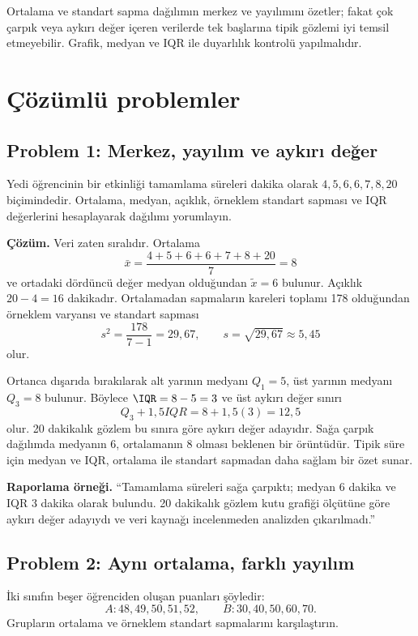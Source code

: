 \begin{assumptionbox}
Ortalama ve standart sapma dağılımın merkez ve yayılımını özetler; fakat çok
çarpık veya aykırı değer içeren verilerde tek başlarına tipik gözlemi iyi
temsil etmeyebilir. Grafik, medyan ve IQR ile duyarlılık kontrolü yapılmalıdır.
\end{assumptionbox}

\section{Çözümlü problemler}

\subsection*{Problem 1: Merkez, yayılım ve aykırı değer}

Yedi öğrencinin bir etkinliği tamamlama süreleri dakika olarak
$4,5,6,6,7,8,20$ biçimindedir. Ortalama, medyan, açıklık, örneklem standart
sapması ve IQR değerlerini hesaplayarak dağılımı yorumlayın.

\textbf{Çözüm.} Veri zaten sıralıdır. Ortalama
\[
\bar{x}=\frac{4+5+6+6+7+8+20}{7}=8
\]
ve ortadaki dördüncü değer medyan olduğundan $\widetilde{x}=6$ bulunur.
Açıklık $20-4=16$ dakikadır. Ortalamadan sapmaların kareleri toplamı 178
olduğundan örneklem varyansı ve standart sapması
\[
s^2=\frac{178}{7-1}=29{,}67,
\qquad s=\sqrt{29{,}67}\approx5{,}45
\]
olur.

Ortanca dışarıda bırakılarak alt yarının medyanı $Q_1=5$, üst yarının medyanı
$Q_3=8$ bulunur. Böylece $\IQR=8-5=3$ ve üst aykırı değer sınırı
\[
Q_3+1{,}5IQR=8+1{,}5(3)=12{,}5
\]
olur. 20 dakikalık gözlem bu sınıra göre aykırı değer adayıdır. Sağa çarpık
dağılımda medyanın 6, ortalamanın 8 olması beklenen bir örüntüdür. Tipik süre
için medyan ve IQR, ortalama ile standart sapmadan daha sağlam bir özet sunar.

\textbf{Raporlama örneği.} ``Tamamlama süreleri sağa çarpıktı; medyan 6 dakika
ve IQR 3 dakika olarak bulundu. 20 dakikalık gözlem kutu grafiği ölçütüne göre
aykırı değer adayıydı ve veri kaynağı incelenmeden analizden çıkarılmadı.''

\subsection*{Problem 2: Aynı ortalama, farklı yayılım}

İki sınıfın beşer öğrenciden oluşan puanları şöyledir:
\[
A:48,49,50,51,52,\qquad
B:30,40,50,60,70.
\]
Grupların ortalama ve örneklem standart sapmalarını karşılaştırın.

